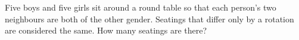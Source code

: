 Five boys and five girls sit around a round table so that each person's two neighbours are both of the other gender. Seatings that differ only by a rotation are considered the same. How many seatings are there?
